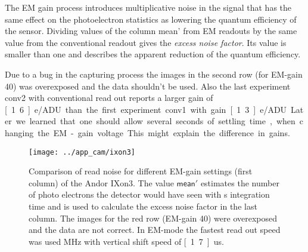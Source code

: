 The EM gain process introduces multiplicative noise in the signal that
has the same effect on the photoelectron statistics as lowering the
quantum efficiency of the sensor. Dividing values of the column
\textsf{ mean'} from EM readouts by the same value from the
conventional readout gives the \emph{excess noise factor}. Its value
is smaller than one and describes the apparent reduction of the
quantum efficiency.


Due to a bug in the capturing process the images in the second row
(for EM-gain 40) was overexposed and the data shouldn't be used.  Also
the last experiment \textsf{conv2} with conventional read out reports
a larger gain of \unit[1.6]{e/ADU} than the first experiment
\textsf{conv1} with gain \unit[1.3]{e/ADU}. Later we learned that one
should allow several seconds of settling time, when changing the
EM-gain voltage. This might explain the difference in gains.


\begin{figure}
  \centering
  \texttt{[image: ../app\_cam/ixon3]}
  \caption{Comparison of read noise for different EM-gain settings
    (first column) of the Andor IXon3. The value $\textsf{mean}'$
    estimates the number of photo electrons the detector would have
    seen with \unit[1]{s} integration time and is used to calculate
    the excess noise factor in the last column. The images for the red
    row (EM-gain 40) were overexposed and the data are not correct. In
    EM-mode the fastest read out speed was used \unit[10]{MHz} with
    vertical shift speed of \unit[1.7]{us}.}
  \label{fig:ixon-table}
\end{figure}


